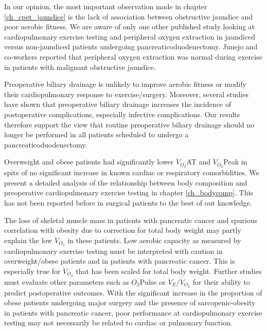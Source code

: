 In our opinion, the most important observation made in chapter \ref{ch_cpet_jaundice} is the lack of association between obstructive jaundice and poor aerobic fitness. 
We are aware of only one other published study looking at cardiopulmonary exercise testing and peripheral oxygen extraction in jaundiced versus non-jaundiced patients undergoing pancreaticoduodenectomy. 
Junejo and co-workers reported that peripheral oxygen extraction was normal during exercise in patients with malignant obstructive jaundice.\parencite{junejo_peripheral_2014} 

Preoperative biliary drainage is unlikely to improve aerobic fitness or modify their cardiopulmonary response to exercise/surgery.
Moreover, several studies have shown that preoperative biliary drainage increases the incidence of postoperative complications, especially infective complications. \parencite{van_der_gaag_preoperative_2010, arkadopoulos_preoperative_2014, fujii_preoperative_2015, furukawa_negative_2015}
Our results therefore support the view that routine preoperative biliary drainage should no longer be performed in all patients scheduled to undergo a pancreaticoduodenectomy.

Overweight and obese patients had significantly lower $\dot{V}_{O_2}$AT and $\dot{V}_{O_2}$Peak in spite of no significant increase in known cardiac or respiratory comorbidities. 
We present a detailed analysis of the relationship between body composition and preoperative cardiopulmonary exercise testing in chapter \ref{ch_bodycomp}.
This has not been reported before in surgical patients to the best of out knowledge. 

The loss of skeletal muscle mass in patients with pancreatic cancer and spurious correlation with obesity due to correction for total body weight may partly explain the low $\dot{V}_{O_2}$ in these patients. 
Low aerobic capacity as measured by cardiopulmonary exercise testing must be interpreted with caution in overweight/obese patients and in patients with pancreatic cancer. 
This is especially true for $\dot{V}_{O_2}$ that has been scaled for total body weight.
Further studies must evaluate other parameters such as $O_2$Pulse or $\dot{V}_E/\dot{V}_{O_2}$ for their ability to predict postoperative outcomes. 
With the significant increase in the proportion of obese patients undergoing major surgery and the presence of sarcopenic-obesity in patients with pancreatic cancer, poor performance at cardiopulmonary exercise testing may not necessarily be related to cardiac or pulmonary function. 

